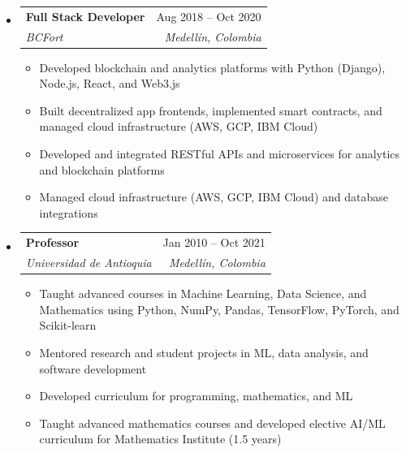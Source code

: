 \documentclass[letterpaper,11pt]{article}
\makeatletter
\newcommand{\resumeSubheading}[4]{
  \vspace{-2pt}
  \item[]
  \begin{tabular*}{\textwidth}{@{\extracolsep{\fill}}l r}
    \textbf{#1} & #2 \\
    \textit{#3} & \textit{#4} \\
  \end{tabular*}
  \vspace{-5pt}
}
\makeatother
\begin{document}
\begin{itemize}[leftmargin=0pt, itemindent=0pt, label={}, itemsep=1pt]
\resumeSubheading
{Full Stack Developer}{Aug 2018 -- Oct 2020}
{BCFort}{Medellín, Colombia}
\begin{itemize}[leftmargin=*, itemsep=0pt]
    \item Developed blockchain and analytics platforms with Python (Django), Node.js, React, and Web3.js
    \item Built decentralized app frontends, implemented smart contracts, and managed cloud infrastructure (AWS, GCP, IBM Cloud)
    \item Developed and integrated RESTful APIs and microservices for analytics and blockchain platforms
    \item Managed cloud infrastructure (AWS, GCP, IBM Cloud) and database integrations
\end{itemize}

\resumeSubheading
{Professor}{Jan 2010 -- Oct 2021}
{Universidad de Antioquia}{Medellín, Colombia}
\begin{itemize}[leftmargin=*, itemsep=0pt]
    \item Taught advanced courses in Machine Learning, Data Science, and Mathematics using Python, NumPy, Pandas, TensorFlow, PyTorch, and Scikit-learn
    \item Mentored research and student projects in ML, data analysis, and software development
    \item Developed curriculum for programming, mathematics, and ML
    \item Taught advanced mathematics courses and developed elective AI/ML curriculum for Mathematics Institute (1.5 years)
\end{itemize}
\end{itemize}
\end{document}
